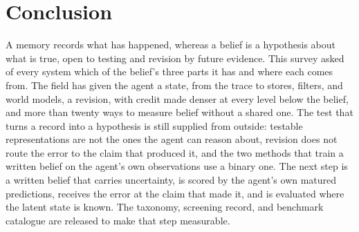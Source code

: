 \section{Conclusion}
\label{sec:conclusion}

A memory records what has happened, whereas a belief is a hypothesis about what is true, open to testing and revision by future evidence. This survey asked of every system which of the belief's three parts it has and where each comes from. The field has given the agent a state, from the trace to stores, filters, and world models, a revision, with credit made denser at every level below the belief, and more than twenty ways to measure belief without a shared one. The test that turns a record into a hypothesis is still supplied from outside: testable representations are not the ones the agent can reason about, revision does not route the error to the claim that produced it, and the two methods that train a written belief on the agent's own observations use a binary one. The next step is a written belief that carries uncertainty, is scored by the agent's own matured predictions, receives the error at the claim that made it, and is evaluated where the latent state is known. The taxonomy, screening record, and benchmark catalogue are released to make that step measurable.\label{endconcl}\artifacturl

